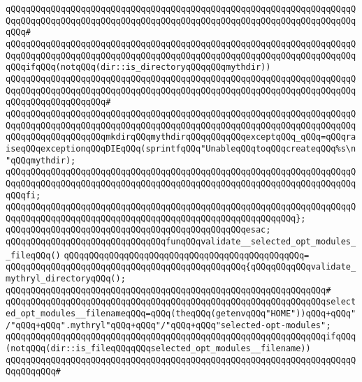 \verb|qQQqqQQqqQQqqQQqqQQqqQQqqQQqqQQqqQQqqQQqqQQqqQQqqQQqqQQqqQQqqQQqqQQqqQQqqQQqqQQqqQQqqQQqqQQqqQQqqQQqqQQqqQQqqQQqqQQqqQQqqQQqqQQqqQQqqQQqqQQqqQQq#|\newline
\verb|qQQqqQQqqQQqqQQqqQQqqQQqqQQqqQQqqQQqqQQqqQQqqQQqqQQqqQQqqQQqqQQqqQQqqQQqqQQqqQQqqQQqqQQqqQQqqQQqqQQqqQQqqQQqqQQqqQQqqQQqqQQqqQQqqQQqqQQqqQQqqQQqifqQQq(notqQQq(dir::is_directoryqQQqqQQqmythdir))|\newline
\verb|qQQqqQQqqQQqqQQqqQQqqQQqqQQqqQQqqQQqqQQqqQQqqQQqqQQqqQQqqQQqqQQqqQQqqQQqqQQqqQQqqQQqqQQqqQQqqQQqqQQqqQQqqQQqqQQqqQQqqQQqqQQqqQQqqQQqqQQqqQQqqQQqqQQqqQQqqQQqqQQq#|\newline
\verb|qQQqqQQqqQQqqQQqqQQqqQQqqQQqqQQqqQQqqQQqqQQqqQQqqQQqqQQqqQQqqQQqqQQqqQQqqQQqqQQqqQQqqQQqqQQqqQQqqQQqqQQqqQQqqQQqqQQqqQQqqQQqqQQqqQQqqQQqqQQqqQQqqQQqqQQqqQQqqQQqmkdirqQQqmythdirqQQqqQQqqQQqexceptqQQq_qQQq=qQQqraiseqQQqexceptionqQQqDIEqQQq(sprintfqQQq"UnableqQQqtoqQQqcreateqQQq%s\n"qQQqmythdir);|\newline
\verb|qQQqqQQqqQQqqQQqqQQqqQQqqQQqqQQqqQQqqQQqqQQqqQQqqQQqqQQqqQQqqQQqqQQqqQQqqQQqqQQqqQQqqQQqqQQqqQQqqQQqqQQqqQQqqQQqqQQqqQQqqQQqqQQqqQQqqQQqqQQqqQQqfi;|\newline
\verb|qQQqqQQqqQQqqQQqqQQqqQQqqQQqqQQqqQQqqQQqqQQqqQQqqQQqqQQqqQQqqQQqqQQqqQQqqQQqqQQqqQQqqQQqqQQqqQQqqQQqqQQqqQQqqQQqqQQqqQQqqQQqqQQq};|\newline
\verb|qQQqqQQqqQQqqQQqqQQqqQQqqQQqqQQqqQQqqQQqqQQqqQQqesac;|\newline
\newline
\verb|qQQqqQQqqQQqqQQqqQQqqQQqqQQqqQQqfunqQQqvalidate__selected_opt_modules__fileqQQq()|\newline
\verb|qQQqqQQqqQQqqQQqqQQqqQQqqQQqqQQqqQQqqQQqqQQqqQQq=|\newline
\verb|qQQqqQQqqQQqqQQqqQQqqQQqqQQqqQQqqQQqqQQqqQQqqQQq{qQQqqQQqqQQqvalidate_mythryl_directoryqQQq();|\newline
\verb|qQQqqQQqqQQqqQQqqQQqqQQqqQQqqQQqqQQqqQQqqQQqqQQqqQQqqQQqqQQqqQQq#|\newline
\verb|qQQqqQQqqQQqqQQqqQQqqQQqqQQqqQQqqQQqqQQqqQQqqQQqqQQqqQQqqQQqqQQqselected_opt_modules__filenameqQQq=qQQq(theqQQq(getenvqQQq"HOME"))qQQq+qQQq"/"qQQq+qQQq".mythryl"qQQq+qQQq"/"qQQq+qQQq"selected-opt-modules";|\newline
\newline
\verb|qQQqqQQqqQQqqQQqqQQqqQQqqQQqqQQqqQQqqQQqqQQqqQQqqQQqqQQqqQQqqQQqifqQQq(notqQQq(dir::is_fileqQQqqQQqselected_opt_modules__filename))|\newline
\verb|qQQqqQQqqQQqqQQqqQQqqQQqqQQqqQQqqQQqqQQqqQQqqQQqqQQqqQQqqQQqqQQqqQQqqQQqqQQqqQQq#|\newline
